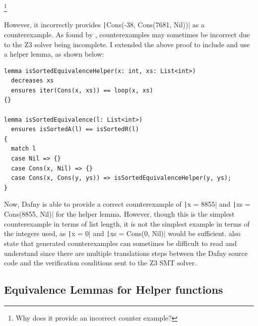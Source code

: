 \footnote{Why does it provide an incorrect counter example?}

However, it incorrectly provides \texttt|Cons(-38, Cons(7681, Nil))| as a counterexample. As found by \textcite{putrueleMaskDToolMeasuring2022}, counterexamples may sometimes be incorrect due to the Z3 solver being incomplete. I extended the above proof to include and use a helper lemma, as shown below:
\begin{verbatim}
lemma isSortedEquivalenceHelper(x: int, xs: List<int>)
  decreases xs
  ensures iter(Cons(x, xs)) == loop(x, xs)
{}

lemma isSortedEquivalence(l: List<int>)
  ensures isSortedA(l) == isSortedR(l)
{
  match l
  case Nil => {}
  case Cons(x, Nil) => {}
  case Cons(x, Cons(y, ys)) => isSortedEquivalenceHelper(y, ys);
}
\end{verbatim}
%

Now, Dafny is able to provide a correct counterexample of \texttt|x = 8855| and \texttt|xs = Cons(8855, Nil)| for the helper lemma. However, though this is the simplest counterexample in terms of list length, it is not the simplest example in terms of the integers used, as \texttt|x = 0| and \texttt|xs = Cons(0, Nil)| would be sufficient. \textcite{putrueleMaskDToolMeasuring2022} also state that generated counterexamples can sometimes be difficult to read and understand since there are multiple translations steps between the Dafny source code and the verification conditions sent to the Z3 SMT solver.

\subsection{Equivalence Lemmas for Helper functions}\label{sec:equivalence-lemmas}

